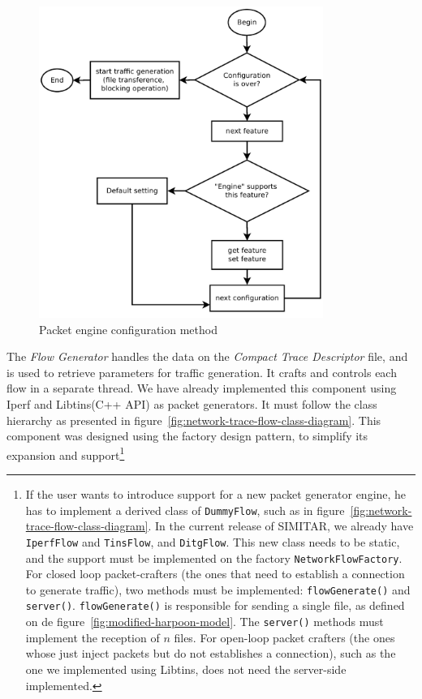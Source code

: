 \begin{figure}[ht!]
    \centering
    \includegraphics[height=4.0in]{figures/ch3/alg-traffic-engine-config}
    \caption{Packet engine configuration method}
    \label{fig:alg-traffic-engine-config}
\end{figure}



The \textit{Flow Generator} handles the data on the \textit{Compact Trace Descriptor} file, and is used to retrieve parameters for traffic generation. It crafts and controls each flow in a separate thread. We have already implemented this component using Iperf and Libtins(C++ API)\cite{web-libtins} as packet generators. It must follow the class hierarchy as presented in figure~\ref{fig:network-trace-flow-class-diagram}. This component was designed using the factory design pattern, to simplify its expansion and support\footnote{
If the user wants to introduce support for a new packet generator engine, he has to implement a derived class of \texttt{DummyFlow}, such as in figure~\ref{fig:network-trace-flow-class-diagram}. In the current release of SIMITAR, we already have \texttt{IperfFlow} and \texttt{TinsFlow}, and \texttt{DitgFlow}. This new class needs to be static, and the support must be implemented on the factory \texttt{NetworkFlowFactory}.
For closed loop packet-crafters (the ones that need to establish a connection to generate traffic), two methods must be implemented: \texttt{flowGenerate()} and \texttt{server()}. \texttt{flowGenerate()} is responsible for sending a single file, as defined on de figure~\ref{fig:modified-harpoon-model}. The \texttt{server()} methods must implement the reception of $n$ files. For open-loop packet crafters (the ones whose just inject packets but do not establishes a connection), such as the one we implemented using Libtins, does not need the server-side implemented. }


